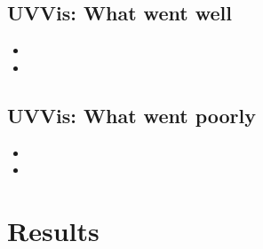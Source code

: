 \subsection{UVVis: What went well}

\begin{itemize}
\item{}
\item{}
\end{itemize}

\subsection{UVVis: What went poorly}

\begin{itemize}
\item{}
\item{}
\end{itemize}


\section{Results}

